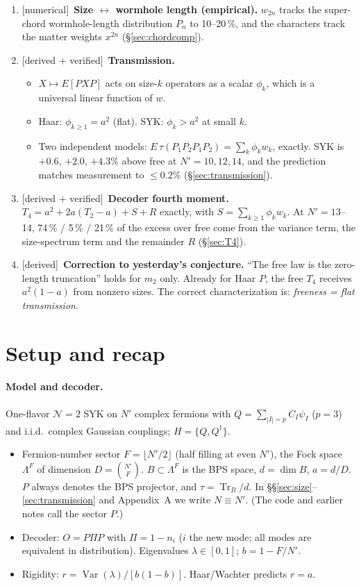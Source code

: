 \documentclass[11pt]{article}
\newcommand{\Tr}{\operatorname{Tr}}
\newcommand{\Var}{\operatorname{Var}}
\newcommand{\Np}{N'}
\newcommand{\tagbox}[2]{\textsf{\small\color{#1}[#2]}}
\newcommand{\DER}{\tagbox{cder}{derived}}
\newcommand{\VER}{\tagbox{cder}{derived + verified}}
\newcommand{\NUM}{\tagbox{cnum}{numerical}}
\theoremstyle{remark}
\begin{document}
\begin{enumerate}
  pairing.
\item \NUM\ \textbf{Size $\leftrightarrow$ wormhole length (empirical).} $w_{2n}$ tracks the super-chord
  wormhole-length distribution $P_n$ to 10--20\,\%, and the characters track the matter weights $x^{2n}$
  (\S\ref{sec:chordcomp}).
\item \VER\ \textbf{Transmission.}
  \begin{itemize}\itemsep1pt
  \item $X\mapsto E[PXP]$ acts on size-$k$ operators as a scalar $\phi_k$, which is a universal linear function of
    $w$.
  \item Haar: $\phi_{k\ge1}=a^2$ (flat). SYK: $\phi_k>a^2$ at small $k$.
  \item Two independent models: $E\,\tau(P_1P_2P_1P_2)=\sum_k\phi_kw_k$, exactly. SYK is $+0.6$, $+2.0$, $+4.3\%$
    above free at $\Np=10,12,14$, and the prediction matches measurement to $\le0.2\%$ (\S\ref{sec:transmission}).
  \end{itemize}
\item \VER\ \textbf{Decoder fourth moment.} $T_4=a^2+2a(T_2-a)+S+R$ exactly, with $S=\sum_{k\ge1}\phi_kw_k$. At
  $\Np=13$--14, 74\,\% / 5\,\% / 21\,\% of the excess over free come from the variance term, the size-spectrum term
  and the remainder $R$ (\S\ref{sec:T4}).
\item \DER\ \textbf{Correction to yesterday's conjecture.} ``The free law is the zero-length truncation'' holds for
  $m_2$ only. Already for Haar $P$, the free $T_4$ receives $a^2(1-a)$ from nonzero sizes. The correct
  characterization is: \emph{freeness = flat transmission}.
\end{enumerate}

\section{Setup and recap}\label{sec:setup}
\paragraph{Model and decoder.}
One-flavor $\mathcal N{=}2$ SYK on $\Np$ complex fermions with $Q=\sum_{|I|=p}C_I\psi_I$ ($p=3$) and i.i.d.\ complex
Gaussian couplings; $H=\{Q,Q^\dagger\}$.
\begin{itemize}\itemsep1pt
\item Fermion-number sector $F=\lfloor\Np/2\rfloor$ (half filling at even $\Np$), the Fock space $\Lambda^F$ of dimension
  $D=\binom{\Np}{F}$. $B\subset\Lambda^F$ is the BPS space, $d=\dim B$, $a=d/D$. $P$ always denotes the BPS projector,
  and $\tau=\Tr_B/d$. In \S\S\ref{sec:size}--\ref{sec:transmission} and Appendix~A we write $N\equiv\Np$.
  (The code and earlier notes call the sector $P$.)
\item Decoder: $O=P\Pi P$ with $\Pi=1-n_i$ ($i$ the new mode; all modes are equivalent in distribution).
  Eigenvalues $\lambda\in[0,1]$; $b=1-F/\Np$.
\item Rigidity: $r=\Var(\lambda)/[b(1-b)]$. Haar/Wachter predicts $r=a$.
\end{itemize}
\end{document}
